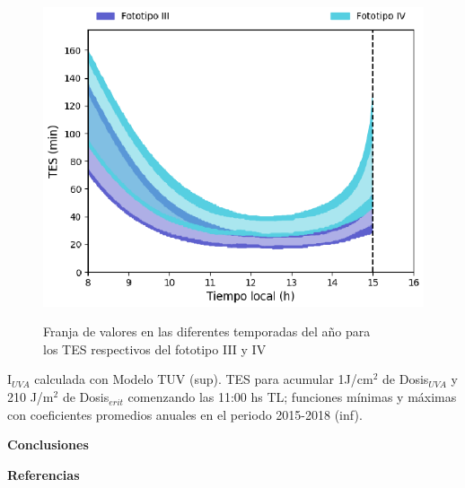 \documentclass{article}
\begin{document}
\begin{multicols}{2}
\begin{figure}[H]
    \includegraphics[scale=1.3]{images/FillDosis2.eps}
    \label{fig:dosismaxima}
    \centering
    \caption{Franja de valores en las diferentes temporadas del año para \\los TES respectivos del fototipo III y IV }
\end{figure}
I$_{UVA}$ calculada con Modelo TUV (sup). TES para acumular 1J/cm$^2$ de Dosis$_{UVA}$ y 210 J/m$^2$ de Dosis$_{erit}$ comenzando las 11:00 hs TL; funciones mínimas y máximas con coeficientes promedios anuales en el periodo 2015-2018 (inf).
\changefontsizes{12pt}
\begin{center}
\begin{shaded}
\changefontsizes{12pt}
\textbf{\textcolor{na}{Conclusiones}}
\end{shaded}
\end{center}
\begin{center}
\begin{shaded}
\textbf{\textcolor{na}{Referencias}}
\end{shaded}
\end{center}
\end{multicols}
\end{document}
